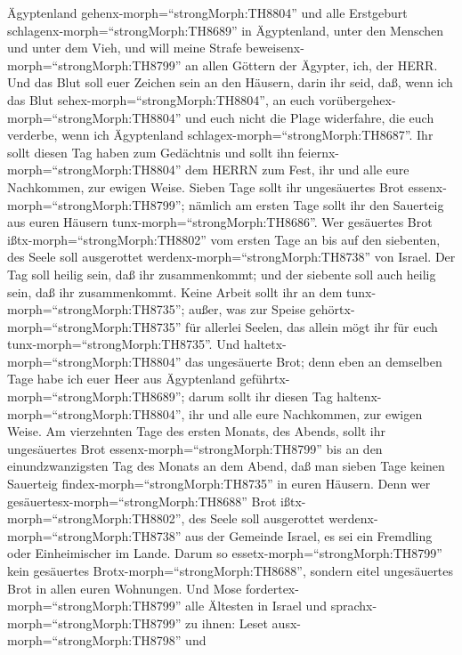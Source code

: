 Ägyptenland gehenx-morph=``strongMorph:TH8804'' und alle Erstgeburt
schlagenx-morph=``strongMorph:TH8689'' in Ägyptenland, unter den
Menschen und unter dem Vieh, und will meine Strafe
beweisenx-morph=``strongMorph:TH8799'' an allen Göttern der Ägypter,
ich, der HERR.  Und das Blut soll euer Zeichen sein an den
Häusern, darin ihr seid, daß, wenn ich das Blut
sehex-morph=``strongMorph:TH8804'', an euch
vorübergehex-morph=``strongMorph:TH8804'' und euch nicht die Plage
widerfahre, die euch verderbe, wenn ich Ägyptenland
schlagex-morph=``strongMorph:TH8687''.  Ihr sollt diesen
Tag haben zum Gedächtnis und sollt ihn
feiernx-morph=``strongMorph:TH8804'' dem HERRN zum Fest, ihr und alle
eure Nachkommen, zur ewigen Weise.  Sieben Tage sollt ihr
ungesäuertes Brot essenx-morph=``strongMorph:TH8799''; nämlich am ersten
Tage sollt ihr den Sauerteig aus euren Häusern
tunx-morph=``strongMorph:TH8686''. Wer gesäuertes Brot
ißtx-morph=``strongMorph:TH8802'' vom ersten Tage an bis auf den
siebenten, des Seele soll ausgerottet
werdenx-morph=``strongMorph:TH8738'' von Israel.  Der Tag
soll heilig sein, daß ihr zusammenkommt; und der siebente soll auch
heilig sein, daß ihr zusammenkommt. Keine Arbeit sollt ihr an dem
tunx-morph=``strongMorph:TH8735''; außer, was zur Speise
gehörtx-morph=``strongMorph:TH8735'' für allerlei Seelen, das allein
mögt ihr für euch tunx-morph=``strongMorph:TH8735''.  Und
haltetx-morph=``strongMorph:TH8804'' das ungesäuerte Brot; denn eben an
demselben Tage habe ich euer Heer aus Ägyptenland
geführtx-morph=``strongMorph:TH8689''; darum sollt ihr diesen Tag
haltenx-morph=``strongMorph:TH8804'', ihr und alle eure Nachkommen, zur
ewigen Weise.  Am vierzehnten Tage des ersten Monats, des
Abends, sollt ihr ungesäuertes Brot essenx-morph=``strongMorph:TH8799''
bis an den einundzwanzigsten Tag des Monats an dem Abend, 
daß man sieben Tage keinen Sauerteig findex-morph=``strongMorph:TH8735''
in euren Häusern. Denn wer gesäuertesx-morph=``strongMorph:TH8688'' Brot
ißtx-morph=``strongMorph:TH8802'', des Seele soll ausgerottet
werdenx-morph=``strongMorph:TH8738'' aus der Gemeinde Israel, es sei ein
Fremdling oder Einheimischer im Lande.  Darum so
essetx-morph=``strongMorph:TH8799'' kein gesäuertes
Brotx-morph=``strongMorph:TH8688'', sondern eitel ungesäuertes Brot in
allen euren Wohnungen.  Und Mose
fordertex-morph=``strongMorph:TH8799'' alle Ältesten in Israel und
sprachx-morph=``strongMorph:TH8799'' zu ihnen: Leset
ausx-morph=``strongMorph:TH8798'' und
